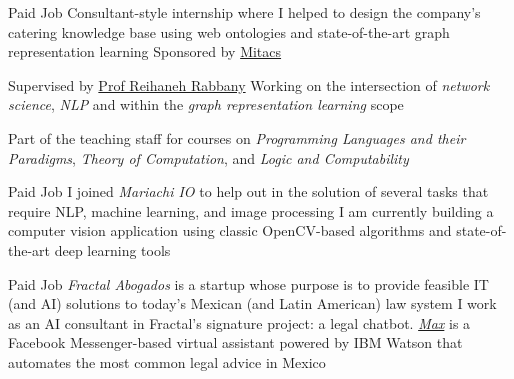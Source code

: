\documentclass[8pt,a4paper,sans]{moderncv} %
\begin{document}
        {Paid Job}
        {Consultant-style internship where I helped to design the company's catering knowledge base using
         web ontologies and state-of-the-art graph representation learning}
        {Sponsored by \href{https://www.mitacs.ca/en}{Mitacs}}
        {}

        {Supervised by \href{https;//wwww.reirab.com}{Prof Reihaneh Rabbany}}
        {Working on the intersection of \emph{network science}, \emph{NLP} and within the \emph{graph representation learning} scope}
        {}
        {}

        {Part of the teaching staff for courses on \emph{Programming Languages and their Paradigms},
         \emph{Theory of Computation}, and \emph{Logic and Computability}}
        {}
        {}
        {}
        
        {Paid Job}
        {I joined \emph{Mariachi IO} to help out in the solution of several tasks that require NLP, machine learning, and image processing}
        {I am currently building a computer vision application using classic OpenCV-based algorithms and state-of-the-art deep learning tools}
        {}
        {}

        {Paid Job}
        {\emph{Fractal Abogados} is a startup whose purpose is to provide feasible IT (and AI) solutions to today's Mexican (and Latin American) law system}
        {I work as an AI consultant in Fractal's signature project: a legal chatbot. \href{https://m.me/fractal-abogados}{\emph{Max}} is a Facebook Messenger-based virtual assistant powered by IBM Watson that automates the most common legal advice in Mexico}
        {}
        {}
\end{document}
